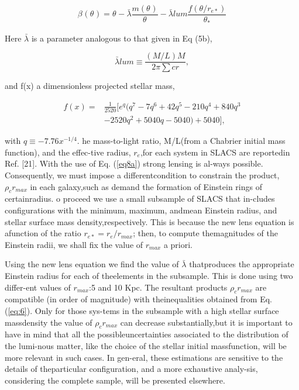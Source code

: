 \documentclass[9.5pt, twocolumn]{article}
\begin{document}
\begin{equation}\label{eq8a}
	\beta_{}(\theta_{})=\theta_{}-\bar{\lambda} \frac{m(\theta_{})}{\theta_{}}-\bar{\lambda}{lum} \frac{f(\theta{}/r_{e*})}{\theta_{*}}
\end{equation}

 Here \(\bar\lambda\) is  a  parameter  analogous  to  that  given  in Eq (5b),
 
\begin{equation}
	\bar{\lambda}{lum}\equiv \frac{(M/L)M}{2\pi\sum{cr}}, 
\end{equation} 

and f(x) a dimensionless projected stellar mass,

\begin{align*}\tag{12}
	 f(x)=&\frac{1}{2520}[e^{q}(q^{7}-7q^{6}+42q^{5}-210q^{4}+840q^{3} \\ 
	 &-2520q^{2}+5040q-5040)+5040],
\end{align*}

with \(q\equiv -7.76x^{-1/4}\). he  mass-to-light  ratio, M/L(from  a  Chabrier  initial  mass  function),  and  the  effec-tive radius, \(r_{e}\),for each system in SLACS are reportedin Ref. [21].  With the use of Eq.  (\ref{eq8a}) strong lensing is al-ways possible.  Consequently, we must impose a differentcondition to constrain the product, \(\rho_{c}r_{max}\) in each galaxy,such as demand the formation of Einstein rings of certainradius.
o proceed we use a small subsample of SLACS that in-cludes configurations with the minimum, maximum, andmean  Einstein  radius,  and  stellar  surface  mass  density,respectively.  This is because the new lens equation is afunction of the ratio \(r_{e*}=r_{e}/r_{max}\); then, to compute themagnitudes of the Einstein radii, we shall fix the value of \(r_{max}\) a priori. 

Using the new lens equation we find the value of \(\bar{\lambda}\) thatproduces the appropriate Einstein radius for each of theelements in the subsample.  This is done using two differ-ent values of \(r_{max}\):5 and 10 Kpc.  The resultant products \(\rho_{c}r_{max}\) are compatible (in order of magnitude) with theinequalities obtained from Eq.  (\ref{eq:6}).  Only for those sys-tems in the subsample with a high stellar surface massdensity  the  value  of \(\rho_{c}r_{max}\) can  decrease  substantially,but it is important to have in mind that all the possibleuncertainties associated to the distribution of the lumi-nous  matter,  like  the  choice  of  the  stellar  initial  massfunction,  will  be  more  relevant  in  such  cases.   In  gen-eral, these estimations are sensitive to the details of theparticular  configuration,  and  a  more  exhaustive  analy-sis,  considering  the  complete  sample,  will  be  presented elsewhere.
\end{document}

